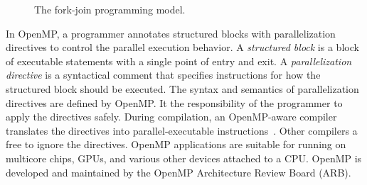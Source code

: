\begin{figure}
\begin{center}
\end{center}
\caption{The fork-join programming model.}\label{fig:fork-join}
\end{figure}

In OpenMP, a programmer annotates {structured blocks} with parallelization {directives} to control the parallel execution behavior.
A \emph{structured block} is a block of executable statements with a single point of entry and exit.
A \emph{parallelization directive} is a syntactical comment that specifies instructions for how the {structured block} should be executed.
The syntax and semantics of {parallelization directives} are defined by OpenMP.
It the responsibility of the programmer to apply the directives safely.
During compilation, an OpenMP-aware compiler translates the directives into parallel-executable instructions~\cite{oak-slides}.
Other compilers a free to ignore the directives.
OpenMP applications are suitable for running on multicore chips, GPUs, and various other devices attached to a CPU.
OpenMP is developed and maintained by the OpenMP Architecture Review Board (ARB).

